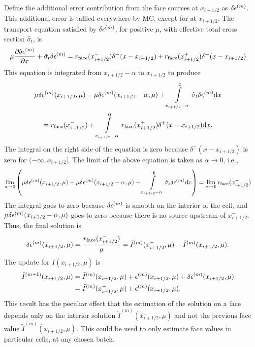 Define the additional error contribution 
from the face sources at $x_{i+1/2}$ as $\delta\epsilon^{(m)}$.  This additional error is tallied
everywhere by MC, except for at $x_{i+1/2}$.  The transport equation satisfied by $\delta\epsilon^{(m)}$, for positive
$\mu$, with effective total cross 
section $\hat \sigma_t$, is
\begin{equation}
    \label{eq:ho_face}
    \mu \frac{\partial \delta\epsilon^{(m)}}{\partial x} + \hat\sigma_t \delta\epsilon^{(m)} = r_{\text{face}}(x_{i+1/2}^-)\delta^-(x - x_{i+1/2}) + r_{\text{face}}(x_{i+1/2}^+)\delta^+(x - x_{i+1/2}) 
\end{equation}
This equation is integrated from $x_{i+1/2}-\alpha$ to $x_{i+1/2}$ to produce
\begin{multline}
    \mu\delta\epsilon^{(m)}(x_{i+1/2},\mu) - \mu\delta\epsilon^{(m)}(x_{i+1/2}-\alpha,\mu)  + \int\limits_{x_{i+1/2}-\alpha}^0 
    \hat \sigma_t \delta\epsilon^{(m)} \mathrm{d} x  \\ =  r_{\text{face}}(x_{i+1/2}^-) +
        \int\limits_{x_{i+1/2}-\alpha}^0r_{\text{face}}(x_{i+1/2}^+)\delta^+(x - x_{i+1/2}) \mathrm{d} x.
\end{multline}
The integral on the right side of the equation is zero because $\delta^+(x-x_{i+1/2})$ is
zero for $(-\infty,x_{i+1/2}]$.  The limit of the above equation is taken as $\alpha\to0$, i.e.,
\begin{multline}
    \lim_{\alpha\to0}\left( \mu\delta\epsilon^{(m)}(x_{i+1/2},\mu) - \mu\delta\epsilon^{(m)}(x_{i+1/2}-\alpha,\mu)  + \int\limits_{x_{i+1/2}-\alpha}^0 
    \hat \sigma_t \delta\epsilon^{(m)} \mathrm{d} x \right)  = \lim_{\alpha\to0} r_{\text{face}}(x_{i+1/2}^-) 
\end{multline}
The integral goes to zero because $\delta\epsilon^{(m)}$ is smooth on the interior of the cell, and
$\mu\delta\epsilon^{(m)}(x_{i+1/2}-\alpha,\mu)$ goes to zero because there is no source upstream of
$x_{i+1/2}^-$. Thus, the final solution is
\begin{equation}
    \delta\epsilon^{(m)}(x_{i+1/2},\mu) = \frac{r_{\text{face}}(x_{i+1/2}^-)}{\mu} = 
     \tilde I^{(m)}(x_{i+1/2}^-,\mu) - \tilde I^{(m)}(x_{i+1/2},\mu)
.
\end{equation}
The update for $I(x_{i+1/2},\mu)$ is 
\begin{align}
   \tilde I^{(m+1)}(x_{i+1/2},\mu) &= \tilde I^{(m)}(x_{i+1/2},\mu) + \epsilon^{(m)}(x_{i+1/2},\mu) +
    \delta\epsilon^{(m)}(x_{i+1/2},\mu) \\ 
        &= \tilde I^{(m)}(x_{i+1/2}^-,\mu) + \epsilon^{(m)}(x_{i+1/2},\mu).
\end{align}
This result has the peculiar effect that the estimation of the solution on a face depends only on
the interior solution $\tilde I^{(m)}(x_{i+1/2}^-,\mu)$ and not the previous face value 
$\tilde I^{(m)}(x_{i+1/2},\mu)$. This could be used to only estimate
face values in particular cells, at any chosen batch.






